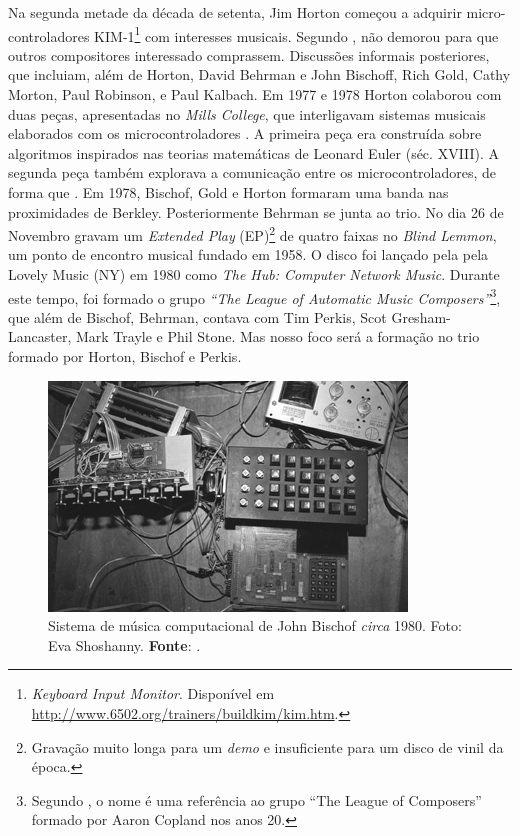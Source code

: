 Na segunda metade da década de setenta, Jim Horton começou a adquirir micro-controladores KIM-1\footnote{\emph{Keyboard Input Monitor}. Disponível em \url{http://www.6502.org/trainers/buildkim/kim.htm}.} com interesses musicais. Segundo , não demorou para que outros compositores interessado comprassem. Discussões informais posteriores, que incluiam, além de Horton, David Behrman e John Bischoff, Rich Gold, Cathy Morton, Paul Robinson, e Paul Kalbach. Em 1977 e 1978  Horton colaborou com duas peças, apresentadas no \emph{Mills College}, que interligavam sistemas musicais elaborados com os microcontroladores . A primeira peça era construída sobre algoritmos inspirados nas teorias matemáticas de Leonard Euler (séc. XVIII). A segunda peça também explorava a comunicação entre os microcontroladores, de forma que . Em 1978, Bischof, Gold e Horton formaram uma banda nas proximidades de Berkley. Posteriormente Behrman se junta ao trio. No dia 26 de Novembro gravam um \emph{Extended Play} (EP)\footnote{Gravação muito longa para um \emph{demo} e insuficiente para um disco de vinil da época.} de quatro faixas no \emph{Blind Lemmon}, um ponto de encontro musical fundado em 1958. O disco foi lançado pela pela Lovely Music (NY) em 1980 como \emph{The Hub: Computer Network Music}.  Durante este tempo, foi formado o grupo \emph{``The League of Automatic Music Composers''}\footnote{Segundo , o nome é uma referência ao grupo ``The League of Composers'' formado por Aaron Copland nos anos 20.}, que além de  Bischof, Behrman, contava com Tim Perkis, Scot Gresham-Lancaster, Mark Trayle e Phil Stone. Mas nosso foco será a formação no trio formado por Horton, Bischof e Perkis.

\begin{figure}[!h]
  \centering
  \includegraphics[scale=0.7]{imagens/siskim1.jpg}
  \caption{Sistema de música computacional de John Bischof \emph{circa} 1980. Foto: Eva Shoshanny\protect\footnotemark. \textbf{Fonte}: .}
  \label{fig:siskim1}
\end{figure}


